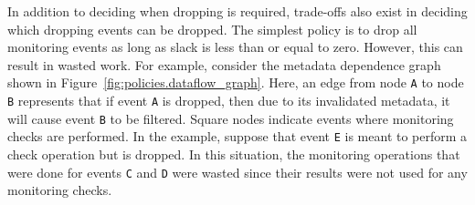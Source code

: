 In addition to deciding when dropping is required, trade-offs also exist in
deciding which dropping events can be dropped.
The simplest policy is to drop all monitoring events as
long as slack is less than or equal to zero.  However, this can result in
wasted work. For example, consider the metadata dependence graph shown in
Figure~\ref{fig:policies.dataflow_graph}. Here, an edge from node {\tt A} to node
{\tt B} represents that if event {\tt A} is dropped, then due to its
invalidated metadata, it will cause event {\tt B} to be filtered. Square
nodes indicate events where monitoring checks are performed. In the
example, suppose that event {\tt E} is meant to perform a check operation but is dropped.
In this situation, the
monitoring operations that were done for events {\tt C} and {\tt D} were wasted
since their results were not used for any monitoring checks.

